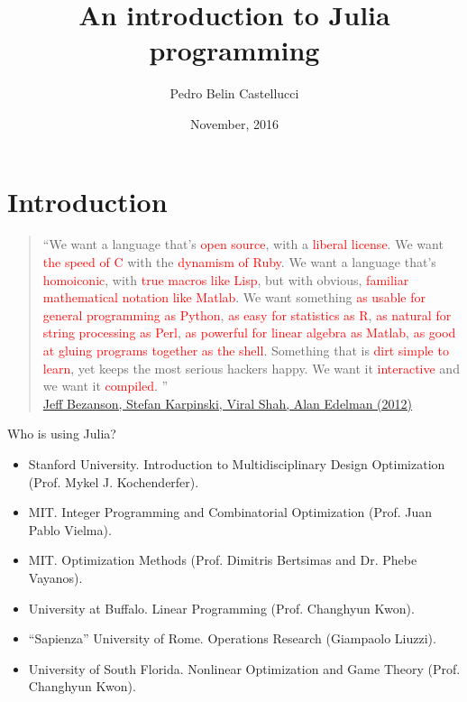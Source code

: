 \documentclass{beamer}
\title[Your Short Title]{An introduction to Julia programming}
\author{Pedro Belin Castellucci}
\date{November, 2016}
\begin{document}


\begin{frame}
  \titlepage
\end{frame}


\section{Introduction}

\begin{frame}
  \begin{quote}\footnotesize

  ``We want a language that’s \textcolor<2->{red}{open source}, with a \textcolor<3->{red}{liberal license}. We want \textcolor<4->{red}{the speed of C} with the \textcolor<5->{red}{dynamism of Ruby}. We want a language that’s \textcolor<6->{red}{homoiconic}, with \textcolor<7->{red}{true macros like Lisp}, but with obvious, \textcolor<8->{red}{familiar mathematical notation like Matlab}. We want something \textcolor<9->{red}{as usable for general programming as Python}, \textcolor<10->{red}{as easy for statistics as R}, \textcolor<11->{red}{as natural for string processing as Perl}, \textcolor<12->{red}{as powerful for linear algebra as Matlab}, \textcolor<13->{red}{as good at gluing programs together as the shell}. Something that is \textcolor<14->{red}{dirt simple to learn}, yet keeps the most serious hackers happy. We want it \textcolor<15->{red}{interactive} and we want it \textcolor<16->{red}{compiled}.
\newline
{}''\\
  \href{http://julialang.org/blog/2012/02/why-we-created-julia}{Jeff Bezanson, Stefan Karpinski, Viral Shah, Alan Edelman (2012)}
     \end{quote}
\end{frame}


\begin{frame}{Who is using Julia?}
  \begin{itemize}\footnotesize
  \item[] Stanford University. Introduction to Multidisciplinary Design Optimization (Prof. Mykel J. Kochenderfer).
  \item[] MIT. Integer Programming and Combinatorial Optimization (Prof. Juan Pablo Vielma).
  \item[] MIT. Optimization Methods (Prof. Dimitris Bertsimas and Dr. Phebe Vayanos).
  \item[] University at Buffalo. Linear Programming (Prof. Changhyun Kwon).
  \item[] “Sapienza” University of Rome. Operations Research (Giampaolo Liuzzi).
    \item[] University of South Florida. Nonlinear Optimization and Game Theory (Prof. Changhyun Kwon).
  \end{itemize}
\end{frame}
\end{document}
